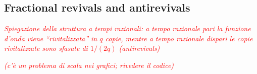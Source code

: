 \documentclass{article}
\newcommand{\cmnt}[1]{\textcolor{red}{\emph{#1}}}
\newcommand{\figurewrapper}[4]{
    \begin{figure}[h]
    \centering{
    \def\svgwidth{\linewidth}
    {#1}
    \caption{#3}
    \label{fig:#4}
    }
    \end{figure}
}
\newcommand{\immagine}[4]{
    \figurewrapper{}{#2}{#3}{#4}
}
\begin{document}
\subsection{Fractional revivals and antirevivals}

\cmnt{Spiegazione della struttura a tempi razionali: a tempo razionale pari la funzione d'onda viene ``rivitalizzata'' in $q$ copie, mentre a tempo razionale dispari le copie rivitalizzate sono sfasate di $1/(2q)$ (antirevivals)}











\cmnt{(c'è un problema di scala nei grafici; rivedere il codice)}


\printbibliography
\end{document}
